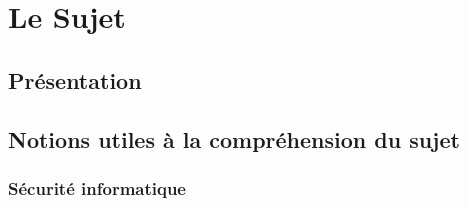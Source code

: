 \chapter{Le Sujet}

\section{Présentation}


\section{Notions utiles à la compréhension du sujet}

\subsection{Sécurité informatique}

